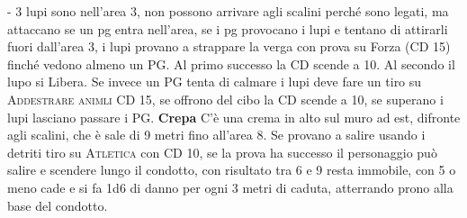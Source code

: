 \documentclass{article}
\begin{document}
- 3 lupi sono nell'area 3, non possono arrivare agli scalini perché sono legati, ma attaccano se un pg entra nell'area, se i pg provocano i lupi e tentano di attirarli fuori dall'area 3, i lupi provano a strappare la verga con prova su Forza (CD 15) finché vedono almeno un PG. Al primo successo la CD scende a 10. Al secondo il lupo si Libera. \newline
Se invece un PG tenta di calmare i lupi deve fare un tiro su \textsc{Addestrare animli} CD 15, se offrono del cibo la CD scende a 10, se superano i lupi lasciano passare i PG.\newline
\textbf{Crepa} C'è una crema in alto sul muro ad est, difronte agli scalini, che è sale di 9 metri fino all'area 8. Se provano a salire usando i detriti tiro su \textsc{Atletica} con CD 10, se la prova ha successo il personaggio può salire e scendere lungo il condotto, con risultato tra 6 e 9 resta immobile, con 5 o meno cade e si fa 1d6 di danno per ogni 3 metri di caduta, atterrando prono alla base del condotto.
\end{document}
